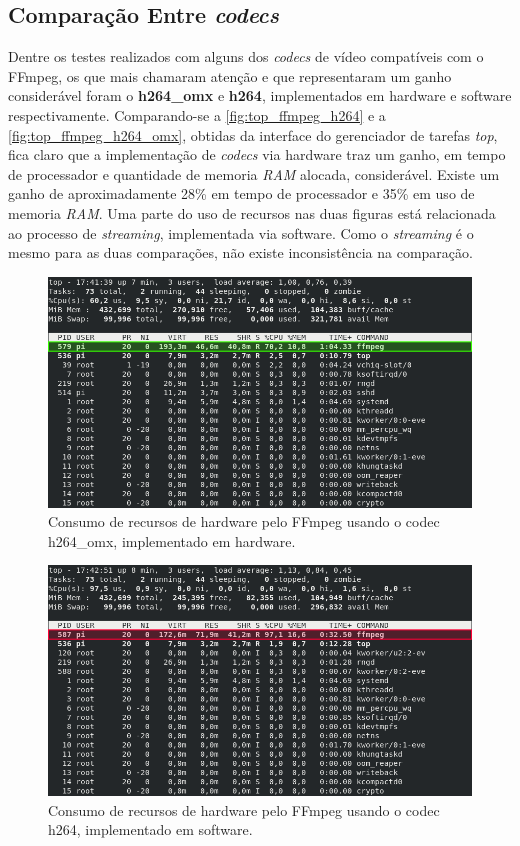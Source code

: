 \subsection{Comparação Entre \textit{codecs}}
\label{subsec:compcodecs}

Dentre os testes realizados com alguns dos \textit{codecs} de vídeo compatíveis com o FFmpeg, os que mais chamaram atenção e que representaram um ganho considerável foram o \textbf{h264\_omx} e \textbf{h264}, implementados em hardware e software respectivamente.
Comparando-se a \autoref{fig:top_ffmpeg_h264} e a \autoref{fig:top_ffmpeg_h264_omx}, obtidas da interface do gerenciador de tarefas \textit{top}, fica claro que a implementação de \textit{codecs} via hardware traz um ganho, em tempo de processador e quantidade de memoria \textit{RAM} alocada, considerável. Existe um ganho de aproximadamente 28\% em tempo de processador e 35\% em uso de memoria \textit{RAM}. Uma parte do uso de recursos nas duas figuras está relacionada ao processo de \textit{streaming}, implementada via software. Como o \textit{streaming} é o mesmo para as duas comparações, não existe inconsistência na comparação.

\begin{figure}[H]
	\centering
	\includegraphics[width=1\textwidth]{figuras/top_ffmpeg_h264_omx.png}
	\caption{Consumo de recursos de hardware pelo FFmpeg usando o codec h264\_omx, implementado em hardware.}
	\label{fig:top_ffmpeg_h264_omx}
\end{figure}

\begin{figure}[H]
	\centering
	\includegraphics[width=1\textwidth]{figuras/top_ffmpeg_h264.png}
	\caption{Consumo de recursos de hardware pelo FFmpeg usando o codec h264, implementado em software.}
	\label{fig:top_ffmpeg_h264}
\end{figure}

